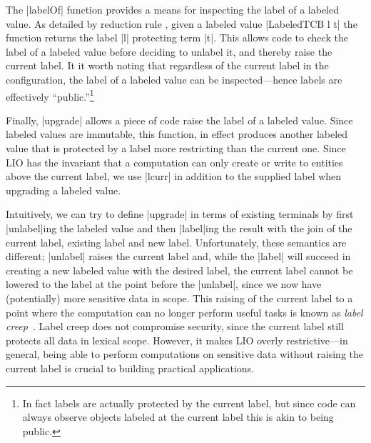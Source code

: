 The |labelOf| function provides a means for inspecting the label of a
labeled value.
%
As detailed by reduction rule , given a labeled value
|LabeledTCB l t| the function returns the label |l| protecting term
|t|.
%
This allows code to check the label of a labeled value before deciding
to unlabel it, and thereby raise the current label.
%
It it worth noting that regardless of the current label in the
configuration, the label of a labeled value can be inspected---hence
labels are effectively ``public.''\footnote{
In fact labels are actually protected by the current label, but since
code can always observe objects labeled at the current label this is
akin to being public.
}

Finally, |upgrade| allows a piece of code raise the label of a
labeled value.
%
Since labeled values are immutable, this function, in effect produces
another labeled value that is protected by a label more restricting
than the current one.
%
Since LIO has the invariant that a computation can only create or
write to entities above the current label, we use |lcurr| in addition
to the supplied label when upgrading a labeled value.

Intuitively, we can try to define |upgrade| in terms of existing
terminals by first |unlabel|ing the labeled value and then |label|ing
the result with the join of the current label, existing label and new
label.
%
Unfortunately, these semantics are different; |unlabel| raises the
current label and, while the |label| will succeed in creating a new
labeled value with the desired label, the current label cannot be
lowered to the label at the point before the |unlabel|, since we now
have (potentially) more sensitive data in scope.
%
This raising of the current label to a point where the computation can
no longer perform useful tasks is known as \emph{label
creep}~\cite{sabelfeld:language-based-iflow}.
%
Label creep does not compromise security, since the current
label still protects all data in lexical scope.
%
However, it makes LIO overly restrictive---in general, being able to
perform computations on sensitive data without raising the current
label is crucial to building practical applications.

